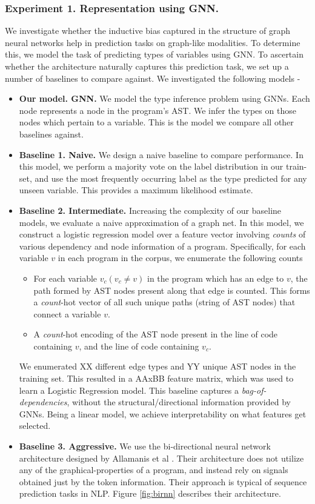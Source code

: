\subsubsection{Experiment 1. Representation using GNN.}
We investigate whether the inductive bias captured in the structure of graph neural networks help in prediction tasks on graph-like modalities. To determine this, we model the task of predicting types of variables using GNN. To ascertain whether the architecture naturally captures this prediction task, we set up a number of baselines to compare against. We investigated the following models -
\begin{itemize}[noitemsep,topsep=0pt]
	\item \textbf{Our model. GNN.} We model the type inference problem using GNNs. Each node represents a node in the program's AST. We infer the types on those nodes which pertain to a variable. This is the model we compare all other baselines against.
	\item \textbf{Baseline 1. Naive.} We design a naive baseline to compare performance. In this model, we perform a majority vote on the label distribution in our train-set, and use the most frequently occurring label as the type predicted for any unseen variable. This provides a maximum likelihood estimate.
	\item \textbf{Baseline 2. Intermediate.} Increasing the complexity of our baseline models, we evaluate a naive approximation of a graph net. In this model, we construct a logistic regression model over a feature vector involving \textit{counts} of various dependency and node information of a program. Specifically, for each variable $v$ in each program in the corpus, we enumerate the following counts
	\begin{itemize}[noitemsep,topsep=0pt]
		\item For each variable $v_c (v_c\not=v)$ in the program which has an edge to $v$, the path formed by AST nodes present along that edge is counted. This forms a \textit{count}-hot vector of all such unique paths (string of AST nodes) that connect a variable $v$.
		\item A \textit{count}-hot encoding of the AST node present in the line of code containing $v$, and the line of code containing $v_c$.
	\end{itemize}
	We enumerated XX different edge types and YY unique AST nodes in the training set. This resulted in a AAxBB feature matrix, which was used to learn a Logistic Regression model. This baseline captures a \textit{bag-of-dependencies}, without the structural/directional information provided by GNNs. Being a linear model, we achieve interpretability on what features get selected.
	\item \textbf{Baseline 3. Aggressive.} We use the bi-directional neural network architecture designed by Allamanis et al \cite{hellendoorn2018deep}. Their architecture does not utilize any of the graphical-properties of a program, and instead rely on signals obtained just by the token information. Their approach is typical of sequence prediction tasks in NLP. Figure \ref{fig:birnn} describes their architecture.
\end{itemize}
